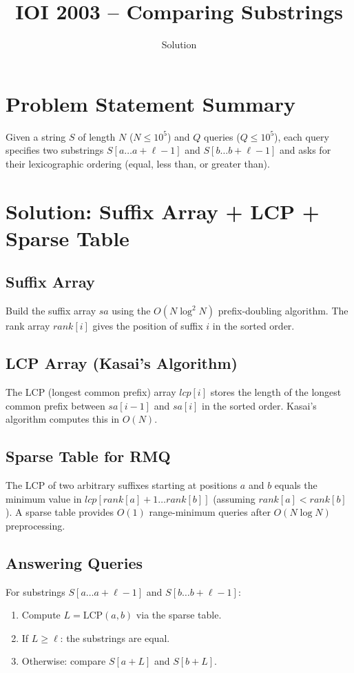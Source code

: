 \documentclass[11pt,a4paper]{article}
\title{IOI 2003 -- Comparing Substrings}
\author{Solution}
\date{}
\begin{document}
\maketitle

\section{Problem Statement Summary}
Given a string $S$ of length $N$ ($N \le 10^5$) and $Q$ queries
($Q \le 10^5$), each query specifies two substrings
$S[a \ldots a{+}\ell{-}1]$ and $S[b \ldots b{+}\ell{-}1]$ and asks
for their lexicographic ordering (equal, less than, or greater than).

\section{Solution: Suffix Array + LCP + Sparse Table}

\subsection{Suffix Array}
Build the suffix array $\mathit{sa}$ using the $O(N \log^2 N)$
prefix-doubling algorithm. The rank array
$\mathit{rank}[i]$ gives the position of suffix $i$ in the sorted
order.

\subsection{LCP Array (Kasai's Algorithm)}
The LCP (longest common prefix) array $\mathit{lcp}[i]$ stores the
length of the longest common prefix between $\mathit{sa}[i-1]$ and
$\mathit{sa}[i]$ in the sorted order. Kasai's algorithm computes this
in $O(N)$.

\subsection{Sparse Table for RMQ}
The LCP of two arbitrary suffixes starting at positions $a$ and $b$
equals the minimum value in $\mathit{lcp}[\mathit{rank}[a]+1 \ldots
\mathit{rank}[b]]$ (assuming $\mathit{rank}[a] < \mathit{rank}[b]$).
A sparse table provides $O(1)$ range-minimum queries after $O(N \log N)$
preprocessing.

\subsection{Answering Queries}
For substrings $S[a \ldots a{+}\ell{-}1]$ and $S[b \ldots b{+}\ell{-}1]$:
\begin{enumerate}
  \item Compute $L = \mathrm{LCP}(a, b)$ via the sparse table.
  \item If $L \ge \ell$: the substrings are equal.
  \item Otherwise: compare $S[a + L]$ and $S[b + L]$.
\end{enumerate}
\end{document}
